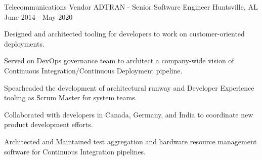 
\begin{cventries}
  \cventry
    {Telecommunications Vendor} %
    {ADTRAN - Senior Software Engineer} %
    {Huntsville, AL} %
    {June 2014 - May 2020} %
    {
      \begin{cvitems} %
        \item {Designed and architected tooling for developers to work on customer-oriented deployments.}
        \item {Served on DevOps governance team to architect a company-wide vision of Continuous Integration/Continuous Deployment pipeline.}
        \item {Spearheaded the development of architectural runway and Developer Experience tooling as Scrum Master for system teams.}
        \item {Collaborated with developers in Canada, Germany, and India to coordinate new product development efforts.}
        \item {Architected and Maintained test aggregation and hardware resource management software for Continuous Integration pipelines.}
      \end{cvitems}
    }

\end{cventries}
